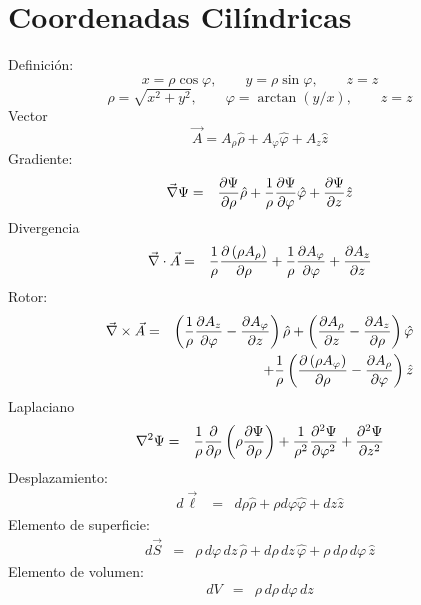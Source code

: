 \section{Coordenadas Cilíndricas}
Definición:
\begin{equation}
 x =\rho\cos\varphi ,\qquad 
 y =\rho\sin\varphi ,\qquad 
 z = z 
\end{equation}
\begin{equation}
\rho =\sqrt{x^2 + y^2} ,\qquad
\varphi =\arctan{(y/x)},\qquad
 z= z 
\end{equation}
Vector
\begin{equation}
\vec{A} =A_\rho {\hat\rho} + A_\varphi {\hat\varphi} +
A_z {\hat z} 
\end{equation}
Gradiente:
\begin{eqnarray}
\vec\nabla\Psi&=&{\partial\Psi\over\partial\rho} {\hat\rho} 
 + {1\over\rho}{\partial\Psi\over\partial\varphi} {\hat\varphi} 
 + {\partial\Psi\over\partial z} {\hat z}
\end{eqnarray} 
Divergencia
\begin{eqnarray}
\vec\nabla\cdot\vec{A}
&=& {1\over\rho}{\partial\left(\rho A_\rho\right)\over\partial
\rho} + {1\over\rho}{\partial A_\varphi\over\partial\varphi} 
 + {\partial A_z\over\partial z}
\end{eqnarray} 
Rotor:
\begin{eqnarray}
\vec\nabla\times\vec{A}
&=&\left({1\over\rho}{\partial A_z\over\partial\varphi}
 - {\partial A_\varphi\over\partial z}\right) {\hat\rho} + 
\left({\partial A_\rho\over\partial z} - {\partial A_z\over
\partial\rho}\right) {\hat\varphi}\nonumber\\
&&+ {1\over\rho}\left({\partial\left(\rho A_\varphi\right)\over
\partial\rho} - {\partial A_\rho\over\partial\varphi}\right) {\hat z}
\end{eqnarray}
Laplaciano
\begin{eqnarray}
\nabla^2\Psi
&=& {1\over\rho}{\partial\over\partial\rho}\left(\rho {\partial\Psi\over
\partial\rho}\right) 
 + {1\over\rho^2}{\partial^2\Psi\over\partial\varphi^2} 
 + {\partial^2\Psi\over\partial z^2}\\
\end{eqnarray} 
Desplazamiento:
\begin{eqnarray}
 d\vec{\ell}
 &=& d\rho {\hat\rho} +\rho d\varphi {\hat\varphi} +dz {\hat z} 
\end{eqnarray} 
Elemento de superficie:
\begin{eqnarray}
 d\vec{S} 
&=&\rho\, d\varphi\, dz\, {\hat\rho} + d\rho
\,dz\, {\hat\varphi} +\rho\,d\rho\, d\varphi\, {\hat z}
\end{eqnarray}
Elemento de volumen:
\begin{eqnarray}
 dV
 &=&\rho\, d\rho\, d\varphi\, dz
\end{eqnarray} 

